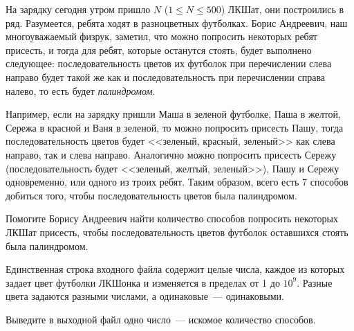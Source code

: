 

На зарядку сегодня утром пришло $N$ ($1 \leqslant N \leqslant 500$) ЛКШат, они построились в ряд. Разумеется,
ребята ходят в разноцветных футболках. Борис Андреевич, наш многоуважаемый физрук,
заметил, что можно попросить некоторых ребят присесть, и тогда для ребят,
которые останутся стоять, будет выполнено следующее: последовательность цветов
их футболок при перечислении слева направо будет такой же как и последовательность
при перечислении справа налево, то есть будет \emph{палиндромом}.

Например, если на зарядку пришли Маша в зеленой футболке, Паша в желтой, Сережа
в красной и Ваня в зеленой, то можно попросить присесть Пашу, тогда последовательность
цветов будет <<зеленый, красный, зеленый>> как слева направо, так и слева направо. Аналогично можно попросить присесть Сережу (последовательность будет <<зеленый, желтый, 
зеленый>>), Пашу и Сережу одновременно, или одного из троих ребят. Таким образом,
всего есть 7 способов добиться того, чтобы последовательность цветов была палиндромом.  

Помогите Борису Андреевич найти количество способов попросить некоторых ЛКШат
присесть, чтобы последовательность цветов футболок оставшихся стоять была палиндромом.

\InputFile
Единственная строка входного файла содержит целые числа, каждое из которых задает цвет футболки ЛКШонка
и изменяется в пределах от 1 до $10^9$. Разные цвета задаются разными числами, а 
одинаковые~--- одинаковыми.

\OutputFile
Выведите в выходной файл одно число~--- искомое количество способов.

